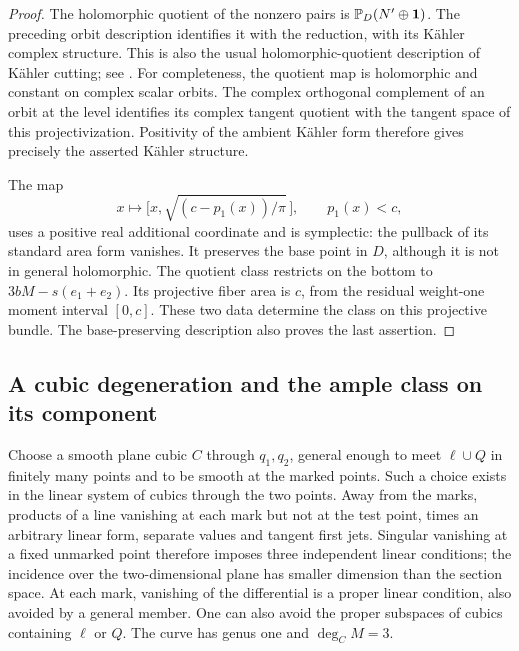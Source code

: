\begin{proof}
The holomorphic quotient of the nonzero pairs is
\(\mathbb P_D(N'\oplus\mathbf1)\).  The preceding orbit description
identifies it with the reduction, with its Kähler complex
structure.  This is also the usual holomorphic-quotient
description of Kähler cutting; see
\cite[Section~2]{BurnsGuilleminLerman2002}.
For completeness, the quotient map is holomorphic and constant
on complex scalar orbits.  The complex orthogonal complement
of an orbit at the level identifies its complex tangent quotient
with the tangent space of this projectivization.  Positivity of
the ambient Kähler form therefore gives precisely the asserted
Kähler structure.

The map
\[
 x\longmapsto
 \bigl[x,\sqrt{(c-p_1(x))/\pi}\,\bigr],\qquad p_1(x)<c,
\]
uses a positive real additional coordinate and is symplectic:
the pullback of its standard area form vanishes.  It preserves
the base point in \(D\), although it is not in general holomorphic.
The quotient class restricts on the bottom to
\(3bM-s(e_1+e_2)\).  Its projective fiber area is \(c\), from the
residual weight-one moment interval \([0,c]\).
These two data determine the class on this projective bundle.
The base-preserving description also proves the last assertion.
\end{proof}

\subsection{A cubic degeneration and the ample class on its component}

Choose a smooth plane cubic \(C\) through \(q_1,q_2\), general
enough to meet \(\ell\cup Q\) in finitely many points and to be
smooth at the marked points.  Such a choice exists in the linear
system of cubics through the two points. Away from the marks, products
of a line vanishing at each mark but not at the test point, times an
arbitrary linear form, separate values and tangent first jets.
Singular vanishing at a fixed unmarked point therefore imposes three
independent linear conditions; the incidence over the two-dimensional
plane has smaller dimension than the section space. At each mark,
vanishing of the differential is a proper linear condition, also
avoided by a general member. One can also avoid the proper subspaces
of cubics containing \(\ell\) or \(Q\).
The curve has genus one
and \(\deg_C M=3\).

